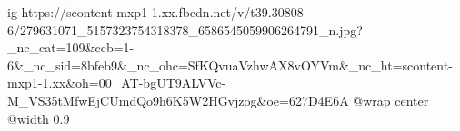  
 
 
 
 

\ifcmt
  ig https://scontent-mxp1-1.xx.fbcdn.net/v/t39.30808-6/279631071_5157323754318378_6586545059906264791_n.jpg?_nc_cat=109&ccb=1-6&_nc_sid=8bfeb9&_nc_ohc=SfKQvuaVzhwAX8vOYVm&_nc_ht=scontent-mxp1-1.xx&oh=00_AT-bgUT9ALVVc-M_VS35tMfwEjCUmdQo9h6K5W2HGvjzog&oe=627D4E6A
  @wrap center
  @width 0.9
\fi

